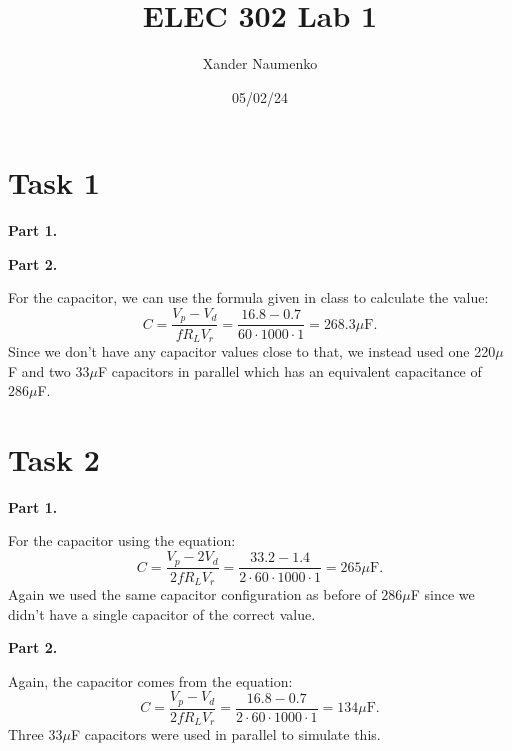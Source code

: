 \documentclass[letterpaper, reqno,11pt]{article}
\begin{document}
\title{ELEC 302 Lab 1}
\date{05/02/24}
\author{Xander Naumenko}
\maketitle

\section{Task 1}

{\medskip\noindent\bf Part 1.} 

{\medskip\noindent\bf Part 2.} 

For the capacitor, we can use the formula given in class to calculate the value:
\[
C = \frac{V_p-V_d}{fR_LV_r}=\frac{16.8-0.7}{60\cdot 1000\cdot 1}=268.3\mu\text{F}
.\]
Since we don't have any capacitor values close to that, we instead used one 220$\mu$F and two $33\mu$F capacitors in parallel which has an equivalent capacitance of $286\mu$F.

\section{Task 2}

{\medskip\noindent\bf Part 1.} 

For the capacitor using the equation:
\[
C = \frac{V_p-2V_d}{2fR_LV_r}=\frac{33.2-1.4}{2\cdot 60\cdot 1000\cdot 1}=265\mu\text{F}
.\]
Again we used the same capacitor configuration as before of $286\mu$F since we didn't have a single capacitor of the correct value.

{\medskip\noindent\bf Part 2.} 

Again, the capacitor comes from the equation:
\[
C = \frac{V_p-V_d}{2fR_LV_r}=\frac{16.8-0.7}{2\cdot 60\cdot 1000\cdot 1}=134\mu\text{F}
.\]
Three 33$\mu$F capacitors were used in parallel to simulate this.
\end{document}
